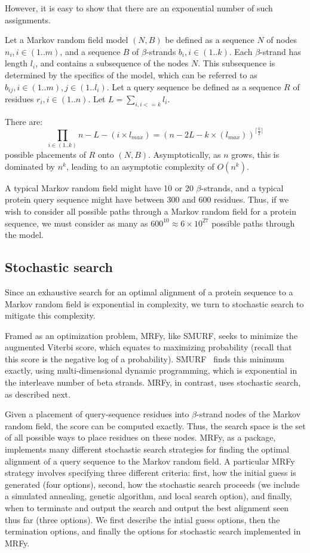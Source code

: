 \documentclass{acm_proc_article-sp}
\begin{document}
However, it is easy to show that there are an exponential number of such
assignments.

Let a Markov random field model $(N,B)$ be defined as a sequence $N$ of nodes 
$n_{i}, i \in (1..m)$, and a sequence $B$ of $\beta$-strands 
$b_{i}, i \in (1..k)$.
Each $\beta$-strand has length $l_{i}$, and contains a subsequence of the nodes
$N$.
This subsequence is determined by the
specifics of the model, which can be referred to as $b_{ij}, i \in (1..m), j \in
(1..l_{i})$.
Let a query sequence be defined as a sequence $R$ of residues
$r_{i}, i \in (1..n)$.
Let $L = \displaystyle \sum \limits_{i, i <= k} l_{i}$.

There are:
\begin{equation*}
  \prod_{i \in (1..k)}{n - L - (i \times l_{max})} = 
  (n - 2L - k\times(l_{max}))^{\lceil \frac{k}{2} \rceil}
\end{equation*}
possible placements of $R$ onto $(N,B)$.
Asymptotically, as $n$ grows, this is dominated by $n^k$, leading to an
asymptotic complexity of $O(n^k)$.

A typical Markov random field might have 10 or 20 $\beta$-strands, and a typical
protein query sequence might have between 300 and 600 residues.
Thus, if we wish to consider all possible paths through a Markov random field
for a protein sequence, we must consider as many as 
$600^{10} \approx 6 \times 10^{27}$ possible paths through the model.

\subsection{Stochastic search}

Since an exhaustive search for an optimal alignment of a protein sequence to a
Markov random field is exponential in complexity, we turn to stochastic search
to mitigate this complexity.

Framed as an optimization problem, MRFy, like SMURF, seeks to minimize the 
augmented Viterbi
score, which equates to maximizing 
probability (recall that this score is the negative log of a probability).
SMURF~\cite{Menke:2010ti} finds this minimum exactly, using multi-dimensional dynamic programming,
which is exponential in the interleave number of beta strands.
MRFy, in contrast, uses stochastic search, as described next.

Given a placement of query-sequence residues into $\beta$-strand nodes of the
Markov random field, the score can be computed exactly.
Thus, the search space is the set of all possible ways to place residues on
these nodes.
MRFy, as a package, implements many different stochastic search strategies for
finding the optimal alignment of a query sequence to the Markov random field.
A particular MRFy strategy involves specifying three different criteria:
first, how the initial guess is generated (four options), second, how the
stochastic search proceeds (we include a simulated annealing, genetic algorithm,
and local search option), and finally, when to terminate and output the search
and output the best alignment seen thus far (three options). We first describe the intial guess options, then the termination options, and finally the options for stochastic search implemented in MRFy. 
\end{document}
